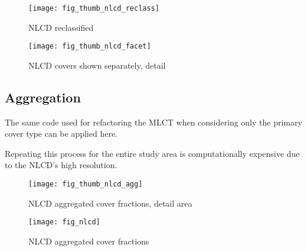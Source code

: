 

\begin{figure} 
\begin{center}


\texttt{[image: fig\_thumb\_nlcd\_reclass]}
\end{center} 
\caption{NLCD reclassified} 
\label{fig:thumb_nlcd_reclass} 
\end{figure} 

\begin{figure} 
\begin{center}
  

\texttt{[image: fig\_thumb\_nlcd\_facet]}
\end{center} 
\caption{NLCD covers shown separately, detail} 
\label{fig:thumb_nlcd_facet} 
\end{figure} 

\subsection{Aggregation}
\label{sec:nlcd-aggr}

The same code used for refactoring the MLCT when considering only the
primary cover type can be applied here.

Repeating this process for the entire study area is computationally
expensive due to the NLCD's high resolution.


 

\begin{figure} 
\begin{center}
  


\texttt{[image: fig\_thumb\_nlcd\_agg]}
\end{center} 
\caption{NLCD aggregated cover fractions, detail area}
\label{fig:thumb_nlcd_agg}
\end{figure} 




\begin{figure} 
\begin{center}
  


\texttt{[image: fig\_nlcd]}
\end{center} 
\caption{NLCD aggregated cover fractions}
\label{fig:nlcd}
\end{figure} 

